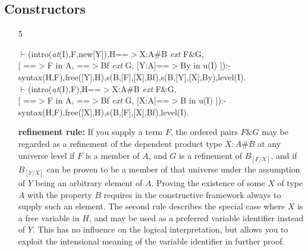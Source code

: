 \documentclass[11pt]{report}
\begin{document}
 \subsection{Constructors}
  
 \begin{enumerate}
 \item[5]
\begin{sf}\begin{tabbing}
$\vdash$(intro(\mbox{\it at}(I),F,new[Y]),H==$>$X:A\#B \mbox{\it ext} F\&G, \\[-0.15ex]
\hspace{2em}[ ==$>$F in A, ==$>$Bf \mbox{\it ext} G, [Y:A]==$>$By in u(I) ]):-\\[-0.15ex]
\hspace{2em}syntax(H,F),free([Y],H),s(B,[F],[X],Bf),s(B,[Y],[X],By),level(I).\\[-0.15ex]
$\vdash$(intro(\mbox{\it at}(I),F),H==$>$X:A\#B \mbox{\it ext} F\&G, \\[-0.15ex]
\hspace{2em}[ ==$>$F in A, ==$>$Bf \mbox{\it ext} G, [X:A]==$>$B in u(I) ]):-\\[-0.15ex]
\hspace{2em}syntax(H,F),free([X],H),s(B,[F],[X],Bf),level(I).
\end{tabbing}\end{sf}

 {\bf refinement rule:}
 If you supply a term $F$, the ordered pairs $F\&G$ may be regarded
 as a refinement of the dependent product type $X:A\#B$ at any
 universe level
 if $F$ is a member of $A$, and $G$ is a refinement of $B_{[F/X]}$,
 and if $B_{[Y/X]}$ can be proven to be a member of that universe
 under the assumption of $Y$ being an arbitrary element of $A$.
 Proving the existence of some $X$ of type $A$ with the property $B$
 requires in the constructive framework always to supply 
 such an element.
 The second rule describes the special case
 where $X$ is a free variable in $H$, and may be used as a
 preferred variable identifier instead of $Y$. This has no 
 influence on the logical interpretation, but allows you to
 exploit the intensional meaning of the variable identifier
 in further proof.
  

\end{enumerate}
\end{document}
